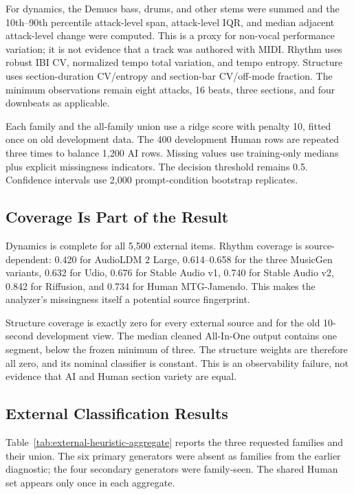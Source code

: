For dynamics, the Demucs bass, drums, and other stems were summed and the
10th--90th percentile attack-level span, attack-level IQR, and median adjacent
attack-level change were computed. This is a proxy for non-vocal performance
variation; it is not evidence that a track was authored with MIDI. Rhythm uses
robust IBI CV, normalized tempo total variation, and tempo entropy. Structure
uses section-duration CV/entropy and section-bar CV/off-mode fraction. The
minimum observations remain eight attacks, 16 beats, three sections, and four
downbeats as applicable.

Each family and the all-family union use a ridge score with penalty 10, fitted
once on old development data. The 400 development Human rows are repeated
three times to balance 1,200 AI rows. Missing values use training-only medians
plus explicit missingness indicators. The decision threshold remains 0.5.
Confidence intervals use 2,000 prompt-condition bootstrap replicates.

\subsection{Coverage Is Part of the Result}

Dynamics is complete for all 5,500 external items. Rhythm coverage is
source-dependent: 0.420 for AudioLDM 2 Large, 0.614--0.658 for the three
MusicGen variants, 0.632 for Udio, 0.676 for Stable Audio v1, 0.740 for Stable
Audio v2, 0.842 for Riffusion, and 0.734 for Human MTG-Jamendo. This makes the
analyzer's missingness itself a potential source fingerprint.

Structure coverage is exactly zero for every external source and for the old
10-second development view. The median cleaned All-In-One output contains one
segment, below the frozen minimum of three. The structure weights are therefore
all zero, and its nominal classifier is constant. This is an observability
failure, not evidence that AI and Human section variety are equal.

\subsection{External Classification Results}

Table~\ref{tab:external-heuristic-aggregate} reports the three requested
families and their union. The six primary generators were absent as families
from the earlier diagnostic; the four secondary generators were family-seen.
The shared Human set appears only once in each aggregate.

